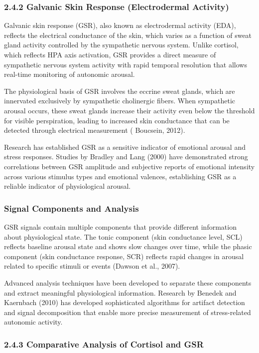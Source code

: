 \documentclass[11pt,a4paper]{article}
\begin{document}
\subsubsection{2.4.2 Galvanic Skin Response (Electrodermal Activity)}

Galvanic skin response (GSR), also known as electrodermal activity (EDA), reflects the electrical conductance of the
skin, which varies as a function of sweat gland activity controlled by the sympathetic nervous system. Unlike cortisol,
which reflects HPA axis activation, GSR provides a direct measure of sympathetic nervous system activity with rapid
temporal resolution that allows real-time monitoring of autonomic arousal.

The physiological basis of GSR involves the eccrine sweat glands, which are innervated exclusively by sympathetic
cholinergic fibers. When sympathetic arousal occurs, these sweat glands increase their activity even below the threshold
for visible perspiration, leading to increased skin conductance that can be detected through electrical measurement (
Boucsein, 2012).

Research has established GSR as a sensitive indicator of emotional arousal and stress responses. Studies by Bradley and
Lang (2000) have demonstrated strong correlations between GSR amplitude and subjective reports of emotional intensity
across various stimulus types and emotional valences, establishing GSR as a reliable indicator of physiological arousal.

\subsubsection{Signal Components and Analysis}

GSR signals contain multiple components that provide different information about physiological state. The tonic
component (skin conductance level, SCL) reflects baseline arousal state and shows slow changes over time, while the
phasic component (skin conductance response, SCR) reflects rapid changes in arousal related to specific stimuli or
events (Dawson et al., 2007).

Advanced analysis techniques have been developed to separate these components and extract meaningful physiological
information. Research by Benedek and Kaernbach (2010) has developed sophisticated algorithms for artifact detection and
signal decomposition that enable more precise measurement of stress-related autonomic activity.

\subsubsection{2.4.3 Comparative Analysis of Cortisol and GSR}
\end{document}
